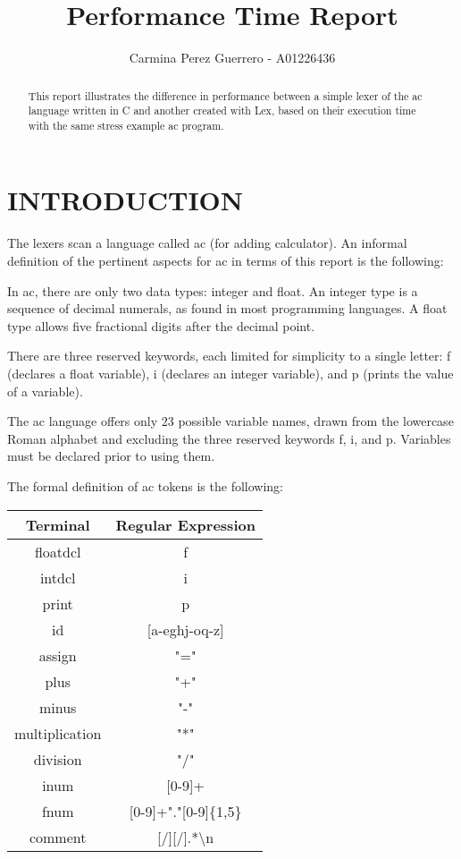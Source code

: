 \documentclass[letterpaper, 10 pt, conference]{ieeeconf}  %
\title{\LARGE \bf
Performance Time Report
}
\author{Carmina Perez Guerrero - A01226436%
}
\begin{document}
\maketitle
\thispagestyle{empty}
\pagestyle{empty}


\begin{abstract}

This report illustrates the difference in performance between a simple lexer of the ac language written in C and another created with Lex, based on their execution time with the same stress example ac program.

\end{abstract}


\section{INTRODUCTION}

The lexers scan a language called ac (for adding calculator). An informal definition of the pertinent aspects for ac in terms of this report is the following:

In ac, there are only two data types: integer and float. An integer type is a sequence of decimal numerals, as found in most programming languages. A float type allows five fractional digits after the decimal point.

There are three reserved keywords, each limited for simplicity to a single letter: f (declares a float variable), i (declares an integer variable), and p (prints the value of a variable).

The ac language offers only 23 possible variable names, drawn from the lowercase Roman alphabet and excluding the three reserved keywords f, i, and p. Variables must be declared prior to using them.

The formal definition of ac tokens is the following:
\begin{center}
\begin{tabular}{ c c }
\hline
 Terminal & Regular Expression \\ [0.5ex] 
 \hline
 floatdcl & f \\ 
 intdcl & i \\
 print & p \\ 
 id & [a-eghj-oq-z] \\ 
 assign & "=" \\ 
 plus & "+" \\ 
 minus & "-" \\ 
 multiplication & "*" \\ 
 division & "/" \\ 
 inum & [0-9]+ \\ 
 fnum & [0-9]+"."[0-9]\{1,5\} \\ 
 comment & [/][/].*\textbackslash n   
\end{tabular}
\end{center}
\end{document}

